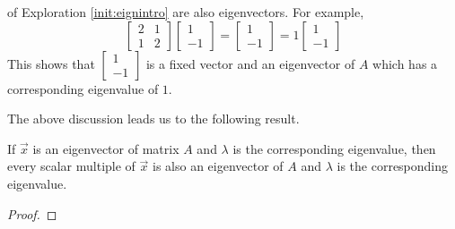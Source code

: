 \documentclass{ximera}
\begin{document}
\begin{center}
\end{center}
    
 of Exploration \ref{init:eignintro} are also eigenvectors.
For example, 
$$\begin{bmatrix} 2& 1\\ 1&2 \end{bmatrix} \begin{bmatrix} 1\\ -1 \end{bmatrix} =
\begin{bmatrix} 1\\ -1 \end{bmatrix}= 1 \begin{bmatrix} 1\\ -1 \end{bmatrix}$$
This shows that $\begin{bmatrix} 1\\ -1 \end{bmatrix}$ is a fixed vector and an eigenvector of $A$ which has a corresponding eigenvalue of $1$.
    
The above discussion leads us to the following result.
    
\begin{theorem}\label{th:eigenScalarMult}
    If $\vec{x}$ is an eigenvector of matrix $A$ and $\lambda$ is the corresponding eigenvalue, then every scalar multiple of $\vec{x}$ is also an eigenvector of $A$
    and $\lambda$ is the corresponding eigenvalue.
\end{theorem}
\begin{proof}

\end{proof}
    
\end{document}
